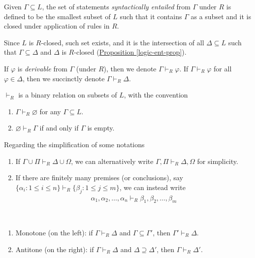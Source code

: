\documentclass{treatise}
\begin{document}
\begin{shaded}
\begin{definition}
Given $\Gamma \subseteq L$, the set of statements \emph{syntactically entailed} from $\Gamma$ under $R$ is defined to be the smallest subset of $L$ such that it contains $\Gamma$ as a subset and it is closed under application of rules in $R$.
\end{definition}
\begin{remark}
Since $L$ is $R$-closed, such set exists, and it is the intersection of all $\Delta \subseteq L$ such that $\Gamma \subseteq \Delta$ and $\Delta$ is $R$-closed (\hyperref[logic-ent-prop]{Proposition \ref*{logic-ent-prop}}).
\end{remark}
If $\varphi$ is \emph{derivable} from $\Gamma$ (under $R$), then we denote $\Gamma \vdash_R \varphi$. If $\Gamma \vdash_R \varphi$ for all $\varphi \in \Delta$, then we succinctly denote $\Gamma \vdash_R \Delta$.
\begin{remark}
$\vdash_R$ is a binary relation on subsets of $L$, with the convention
\begin{enumerate}
    \item $\Gamma \vdash_R \varnothing$ for any $\Gamma \subseteq L$.
    \item $\varnothing \vdash_R \Gamma$ if and only if $\Gamma$ is empty.
\end{enumerate}
\end{remark}
Regarding the simplification of some notations
\begin{enumerate}
    \item If $\Gamma \cup \Pi \vdash_R \Delta \cup \Omega$, we can alternatively write $\Gamma, \Pi \vdash_R \Delta, \Omega$ for simplicity.
    \item If there are finitely many premises (or conclusions), say $\{ \alpha_i : 1 \leq i \leq n \} \vdash_R \{ \beta_j : 1 \leq j \leq m \}$, we can instead write
    \begin{align*}
        \alpha_1, \alpha_2, \hdots, \alpha_n \vdash_R \beta_1, \beta_2, \hdots, \beta_m
    \end{align*}
\end{enumerate}
\begin{proposition} \ 
\begin{enumerate}
    \item Monotone (on the left): if $\Gamma \vdash_R \Delta$ and $\Gamma \subseteq \Gamma'$, then $\Gamma' \vdash_R \Delta$.
    \item Antitone (on the right): if $\Gamma \vdash_R \Delta$ and $\Delta \supseteq \Delta'$, then $\Gamma \vdash_R \Delta'$.

\end{enumerate}
\end{proposition}
\end{shaded}
\end{document}

